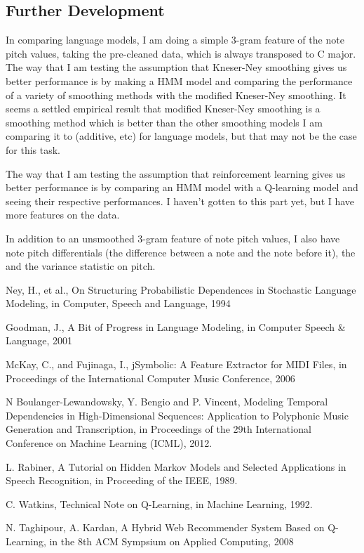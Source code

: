 \documentclass{article}
\begin{document}
\subsection*{Further Development}
In comparing language models, I am doing a simple 3-gram feature of the note pitch values, taking the pre-cleaned data, which is always transposed to C major. The way that I am testing the assumption that Kneser-Ney smoothing gives us better performance is by making a HMM model and comparing the performance of a variety of smoothing methods with the modified Kneser-Ney smoothing. It seems a settled empirical result that modified Kneser-Ney smoothing is a smoothing method
which is better than the other smoothing models I am comparing it to (additive, etc) for language models, but that may not be the case for this task.

The way that I am testing the assumption that reinforcement learning gives us better performance is by comparing an HMM model with a Q-learning model and seeing their respective performances. I haven't gotten to this part yet, but I have more features on the data. 

In addition to an unsmoothed 3-gram feature of note pitch values, I also have note pitch differentials (the difference between a note and the note before it), the and the variance statistic on pitch.

\begin{thebibliography}{9}%

Ney, H., et al., On Structuring Probabilistic Dependences in Stochastic Language Modeling, in Computer, Speech and Language, 1994

Goodman, J., A Bit of Progress in Language Modeling, in Computer Speech & Language, 2001

McKay, C., and Fujinaga, I., jSymbolic: A Feature Extractor for MIDI Files, in Proceedings of the International Computer Music Conference, 2006

N Boulanger-Lewandowsky, Y. Bengio and P. Vincent, Modeling Temporal Dependencies in High-Dimensional Sequences: Application to Polyphonic Music Generation and Transcription, in Proceedings of the 29th International Conference on Machine Learning (ICML), 2012.

L. Rabiner, A Tutorial on Hidden Markov Models and Selected Applications in Speech Recognition, in Proceeding of the IEEE, 1989.

C. Watkins, Technical Note on Q-Learning, in Machine Learning, 1992.

N. Taghipour, A. Kardan, A Hybrid Web Recommender System Based on Q-Learning, in the 8th ACM Sympsium on Applied Computing, 2008

\end{thebibliography}
\end{document}
